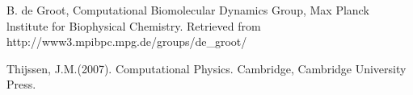 \documentclass{article}
\begin{document}
\begin{thebibliography}{99}

  B. de Groot,
  Computational Biomolecular Dynamics Group, Max Planck lnstitute for Biophysical Chemistry. Retrieved from http://www3.mpibpc.mpg.de/groups/de_groot/
  
  Thijssen, J.M.(2007). Computational Physics. Cambridge, Cambridge University Press.
\end{thebibliography}
\end{document}
